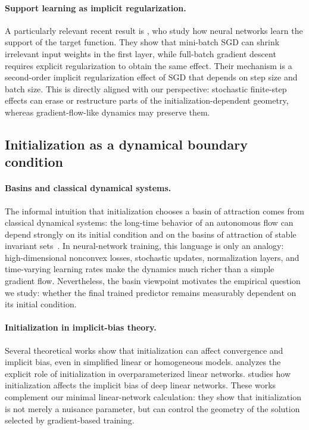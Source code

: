 \documentclass{article}
\begin{document}
\paragraph{Support learning as implicit regularization.}
A particularly relevant recent result is \citep{beneventano2024support}, who study how neural networks learn the support of the target function.  They show that mini-batch SGD can shrink irrelevant input weights in the first layer, while full-batch gradient descent requires explicit regularization to obtain the same effect.  Their mechanism is a second-order implicit regularization effect of SGD that depends on step size and batch size.  This is directly aligned with our perspective: stochastic finite-step effects can erase or restructure parts of the initialization-dependent geometry, whereas gradient-flow-like dynamics may preserve them.

\subsection{Initialization as a dynamical boundary condition}
\label{app:initialization-boundary}

\paragraph{Basins and classical dynamical systems.}
The informal intuition that initialization chooses a basin of attraction comes from classical dynamical systems: the long-time behavior of an autonomous flow can depend strongly on its initial condition and on the basins of attraction of stable invariant sets~\citep{strogatz2015nonlinear,hirsch2013differential}.  In neural-network training, this language is only an analogy: high-dimensional nonconvex losses, stochastic updates, normalization layers, and time-varying learning rates make the dynamics much richer than a simple gradient flow.  Nevertheless, the basin viewpoint motivates the empirical question we study: whether the final trained predictor remains measurably dependent on its initial condition.

\paragraph{Initialization in implicit-bias theory.}
Several theoretical works show that initialization can affect convergence and implicit bias, even in simplified linear or homogeneous models.  \citep{min2021explicit} analyzes the explicit role of initialization in overparameterized linear networks.  \citep{gruber2024role} studies how initialization affects the implicit bias of deep linear networks.  These works complement our minimal linear-network calculation: they show that initialization is not merely a nuisance parameter, but can control the geometry of the solution selected by gradient-based training.
\end{document}
